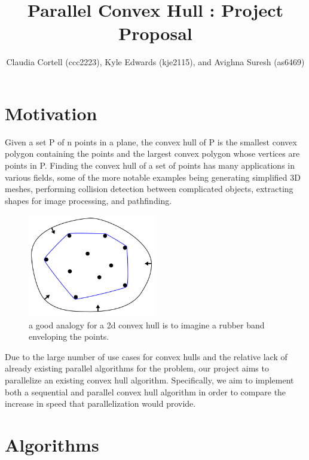 \documentclass[12pt]{article}
\author{Claudia Cortell (ccc2223), Kyle Edwards (kje2115), and Avighna Suresh (as6469)}
\title{Parallel Convex Hull : Project Proposal}
\begin{document}
\maketitle

\setcounter{section}{0}

\section{Motivation}


Given a set P of n points in a plane, the convex hull of P is the smallest convex polygon containing the points and the largest convex polygon whose vertices are points in P. Finding the convex hull of a set of points has many applications in various fields, some of the more notable examples being generating simplified 3D meshes, performing collision detection between complicated objects, extracting shapes for image processing, and pathfinding.

\begin{figure}[h]
	\centering
	\includegraphics[width=0.5\textwidth]{convex_hull.png}
	\caption{a good analogy for a 2d convex hull is to imagine a rubber band
		enveloping the points.}
\end{figure}

Due to the large number of use cases for convex hulls and the relative lack of already existing parallel algorithms for the problem, our project aims to parallelize an existing convex hull algorithm. Specifically, we aim to implement both a sequential and parallel convex hull algorithm in order to compare the increase in speed that parallelization would provide.

\section{Algorithms}
\end{document}
